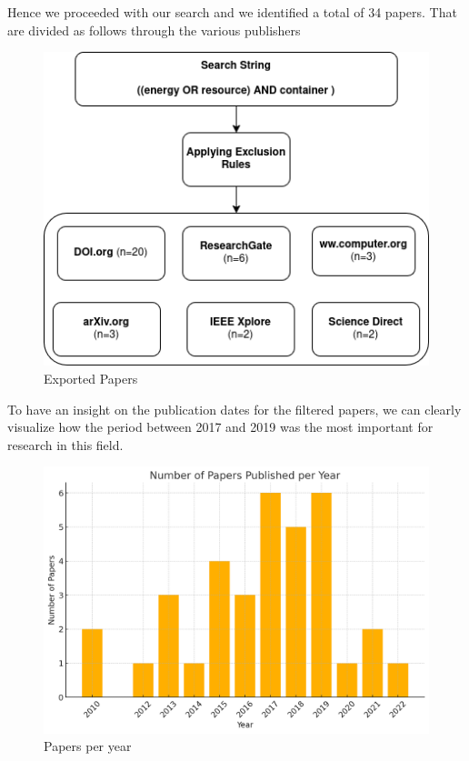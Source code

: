 \begin{multicols}{2}
Hence we proceeded with our search and we identified a total of 34 papers. That are divided as follows through the various publishers

\begin{figure}[H]
    \centering
    \includegraphics[width=\columnwidth]{sections/exportedPapers.png}
    \caption{Exported Papers}
    \label{fig:search_pipeline}
\end{figure}

To have an insight on the publication dates for the filtered papers, we can clearly visualize how the period between 2017 and 2019 was the most important for research in this field.

\begin{figure}[H]
    \centering
    \includegraphics[width=\columnwidth]{papers_per_year.png}
    \caption{Papers per year}
    \label{fig:search_pipeline}
\end{figure}


\end{multicols}
